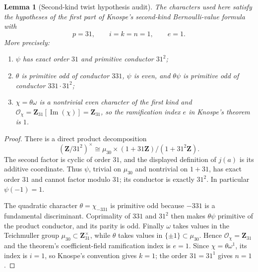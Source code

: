 \documentclass[11pt]{article}
\newtheorem{lemma}[theorem]{Lemma}
\theoremstyle{remark}
\begin{document}
\begin{lemma}[Second-kind twist hypothesis audit]
\label{W31-lem:knospe-second-kind-hypotheses}
The characters used here satisfy the hypotheses of the first part of
Knospe's second-kind Bernoulli-value formula \cite{KnospeSpecialValues2026} with
\[
 p=31,\qquad i=k=n=1,\qquad e=1.
\]
More precisely:
\begin{enumerate}[label=\textup{(\roman*)}]
\item \(\psi\) has exact order \(31\) and primitive conductor \(31^2\);
\item \(\theta\) is primitive odd of conductor \(331\), \(\psi\) is even,
      and \(\theta\psi\) is primitive odd of conductor
      \(331\cdot31^2\);
\item \(\chi=\theta\omega\) is a nontrivial even character of the first kind
      and
      \(\mathcal O_\chi=\mathbf Z_{31}[\operatorname{Im}(\chi)]
      =\mathbf Z_{31}\), so the ramification index \(e\) in Knospe's theorem
      is \(1\).
\end{enumerate}
\end{lemma}

\begin{proof}
There is a direct product decomposition
\[
 (\mathbf Z/31^2)^\times
 \cong \mu_{30}\times
       (1+31\mathbf Z)/(1+31^2\mathbf Z).
\]
The second factor is cyclic of order \(31\), and the displayed definition of
\(j(a)\) is its additive coordinate.  Thus \(\psi\), trivial on
\(\mu_{30}\) and nontrivial on \(1+31\), has exact order \(31\) and cannot
factor modulo \(31\); its conductor is exactly \(31^2\).  In particular
\(\psi(-1)=1\).

The quadratic character \(\theta=\chi_{-331}\) is primitive odd because
\(-331\) is a fundamental discriminant.  Coprimality of \(331\) and \(31^2\)
then makes \(\theta\psi\) primitive of the product conductor, and its parity
is odd.  Finally \(\omega\) takes values in the Teichmuller group
\(\mu_{30}\subset\mathbf Z_{31}^{\times}\), while \(\theta\) takes values in
\(\{\pm1\}\subset\mu_{30}\).  Hence \(\mathcal O_\chi=\mathbf Z_{31}\) and
the theorem's coefficient-field ramification index is \(e=1\).  Since
\(\chi=\theta\omega^1\), its index is \(i=1\), so Knospe's convention gives
\(k=1\); the order \(31=31^1\) gives \(n=1\).
\end{proof}
\end{document}
